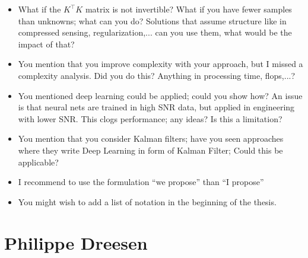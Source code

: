\documentclass[11pt]{article}
\begin{document}
\begin{itemize}
\begin{itemize}
	\item  What if the $K^\top K$ matrix is not invertible? What if you have fewer samples than unknowns; what can you do? Solutions that assume structure like in compressed sensing, regularization,... can you use them, what would be the impact of that?
	\item  You mention that you improve complexity with your approach, but I missed a complexity analysis. Did you do this? Anything in processing time, flops,...?
	\item  You mentioned deep learning could be applied; could you show how? An issue is that neural nets are trained in high SNR data, but applied in engineering with lower SNR. This clogs performance; any ideas? Is this a limitation?
	\item  You mention that you consider Kalman filters; have you seen approaches where they write Deep Learning in form of Kalman Filter; Could this be applicable?
	
	\item I recommend to use the formulation “we propose” than “I propose”
		
	\item You might wish to add a list of notation in the beginning of the thesis.
	
	\end{itemize}
\end{itemize}

\section*{Philippe Dreesen}
\end{document}

